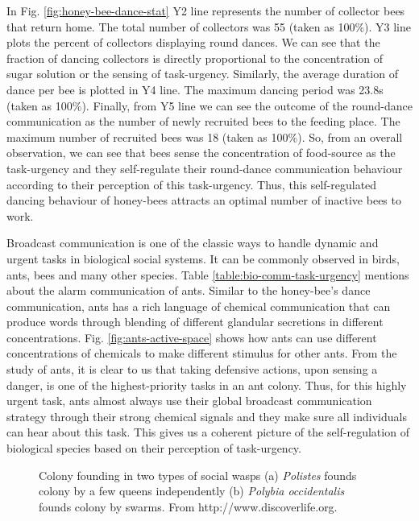 \documentclass{intech}
\begin{document}
In Fig. \ref{fig:honey-bee-dance-stat} Y2 line represents the number of collector bees that return home. The total number of collectors was 55 (taken as 100\%). Y3 line plots the percent of collectors displaying round dances. We can see that the fraction of dancing collectors is directly proportional to the concentration of sugar solution or the sensing of task-urgency. Similarly, the average duration of dance per bee  is plotted in Y4 line. The maximum dancing period was 23.8s (taken as 100\%). Finally, from Y5 line we can see the outcome of the round-dance communication as the number of newly recruited bees to the feeding place. The maximum number of recruited bees was 18 (taken as 100\%). So, from an overall observation, we can see that bees sense the concentration of food-source  as the task-urgency and they self-regulate their round-dance communication behaviour according to their perception of this task-urgency. Thus, this self-regulated dancing behaviour of honey-bees attracts an optimal number of inactive bees to work.

Broadcast communication is one of the classic ways to handle dynamic and urgent tasks in biological social systems. It can be commonly observed in birds, ants, bees and many other species. Table \ref{table:bio-comm-task-urgency} mentions about the alarm communication of ants. Similar to the honey-bee's dance communication, ants has a rich language of chemical communication that can produce words through blending of different glandular secretions in different concentrations. Fig. \ref{fig:ants-active-space} shows how ants can use different concentrations of chemicals to make different stimulus for other ants. From the study of ants, it is clear to us that taking defensive actions, upon sensing a danger, is one of the highest-priority tasks in an ant colony. Thus, for this highly urgent task, ants almost always use their global broadcast communication strategy through their strong chemical signals and they make sure all individuals can hear about this task.  This gives us a coherent picture of the self-regulation of biological species based on their perception of task-urgency.
\begin{figure}
\centering
{} 
\caption{Colony founding in two types of social wasps (a) {\em Polistes}  founds colony by a few queens independently (b) {\em Polybia occidentalis}  founds colony by swarms. From http://www.discoverlife.org.} %
\label{fig:social-wasps}
\end{figure}
\end{document}
